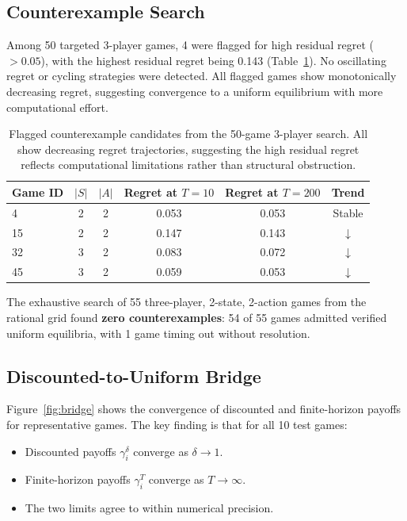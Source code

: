 \documentclass[11pt,a4paper]{article}
\theoremstyle{definition}
\begin{document}
\subsection{Counterexample Search}

Among 50 targeted 3-player games, 4 were flagged for high residual regret ($> 0.05$), with the highest residual regret being 0.143 (Table~\ref{tab:counterexample}).
No oscillating regret or cycling strategies were detected.
All flagged games show monotonically decreasing regret, suggesting convergence to a uniform equilibrium with more computational effort.

\begin{table}[t]
\centering
\caption{Flagged counterexample candidates from the 50-game 3-player search. All show decreasing regret trajectories, suggesting the high residual regret reflects computational limitations rather than structural obstruction.}\label{tab:counterexample}
\begin{tabular}{@{}lccccc@{}}
\toprule
\textbf{Game ID} & $|S|$ & $|A|$ & \textbf{Regret at $T\!=\!10$} & \textbf{Regret at $T\!=\!200$} & \textbf{Trend} \\
\midrule
4  & 2 & 2 & 0.053 & 0.053 & Stable \\
15 & 2 & 2 & 0.147 & 0.143 & $\downarrow$ \\
32 & 3 & 2 & 0.083 & 0.072 & $\downarrow$ \\
45 & 3 & 2 & 0.059 & 0.053 & $\downarrow$ \\
\bottomrule
\end{tabular}
\end{table}

The exhaustive search of 55 three-player, 2-state, 2-action games from the rational grid found \textbf{zero counterexamples}: 54 of 55 games admitted verified uniform equilibria, with 1 game timing out without resolution.

\subsection{Discounted-to-Uniform Bridge}\label{sec:results:bridge}

Figure~\ref{fig:bridge} shows the convergence of discounted and finite-horizon payoffs for representative games.
The key finding is that for all 10 test games:
\begin{itemize}[leftmargin=1.5em]
    \item Discounted payoffs $\gamma_i^\delta$ converge as $\delta \to 1$.
    \item Finite-horizon payoffs $\gamma_i^T$ converge as $T \to \infty$.
    \item The two limits agree to within numerical precision.
\end{itemize}
\end{document}
